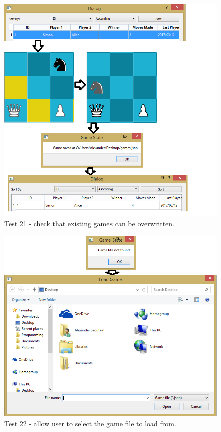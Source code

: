 \begin{figure}[H]
	\centering
	\includegraphics[width=1.0\textwidth]{images/screenshots/test-21}
	\caption{Test 21 - check that existing games can be overwritten.}
	\label{test-21}
\end{figure}
\begin{figure}[H]
	\centering
	\includegraphics[width=1.0\textwidth]{images/screenshots/test-22}
	\caption{Test 22 - allow user to select the game file to load from.}
	\label{test-22}
\end{figure}
